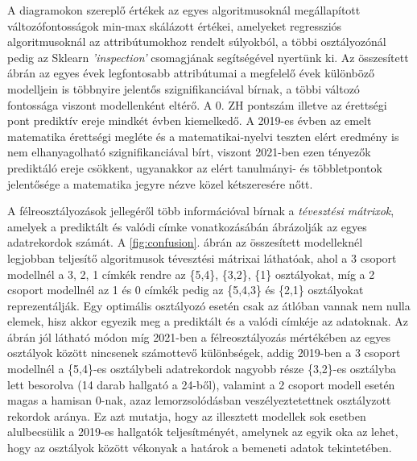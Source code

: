 \documentclass[12pt]{article}
\begin{document}
%	



\noindent A diagramokon szereplő értékek az egyes algoritmusoknál megállapított változófontosságok min-max skálázott értékei, amelyeket regressziós algoritmusoknál az attribútumokhoz rendelt súlyokból, a többi osztályozónál pedig az Sklearn \textit{'inspection'} csomagjának segítségével nyertünk ki. Az összesített ábrán az egyes évek legfontosabb attribútumai a megfelelő évek különböző modelljein is többnyire jelentős szignifikanciával bírnak, a többi változó fontossága viszont modellenként eltérő. A 0. ZH pontszám illetve az érettségi pont prediktív ereje mindkét évben kiemelkedő. A 2019-es évben az emelt matematika érettségi megléte és a matematikai-nyelvi teszten elért eredmény is nem elhanyagolható szignifikanciával bírt, viszont 2021-ben ezen tényezők prediktáló ereje csökkent, ugyanakkor az elért tanulmányi- és többletpontok jelentősége a matematika jegyre nézve közel kétszeresére nőtt.

A félreosztályozások jellegéről több információval bírnak a \emph{tévesztési mátrixok}, amelyek a prediktált és valódi címke vonatkozásábán ábrázolják az egyes adatrekordok számát. A \ref{fig:confusion}. ábrán az összesített modelleknél legjobban teljesítő algoritmusok tévesztési mátrixai láthatóak, ahol a 3 csoport modellnél a 3, 2, 1 címkék rendre az \{5,4\}, \{3,2\}, \{1\} osztályokat, míg a 2 csoport modellnél az 1 és 0 címkék pedig az \{5,4,3\} és \{2,1\} osztályokat reprezentálják. Egy optimális osztályozó esetén csak az átlóban vannak nem nulla elemek, hisz akkor egyezik meg a prediktált és a valódi címkéje az adatoknak. Az ábrán jól látható módon míg 2021-ben a félreosztályozás mértékében az egyes osztályok között nincsenek számottevő különbségek, addig 2019-ben a 3 csoport modellnél a \{5,4\}-es osztálybeli adatrekordok nagyobb része \{3,2\}-es osztályba lett besorolva (14 darab hallgató a 24-ből), valamint a 2 csoport modell esetén magas a hamisan 0-nak, azaz lemorzsolódásban veszélyeztetettnek osztályzott rekordok aránya. Ez azt mutatja, hogy az illesztett modellek sok esetben alulbecsülik a 2019-es hallgatók teljesítményét, amelynek az egyik oka az lehet, hogy az osztályok között vékonyak a határok a bemeneti adatok tekintetében.
\end{document}

